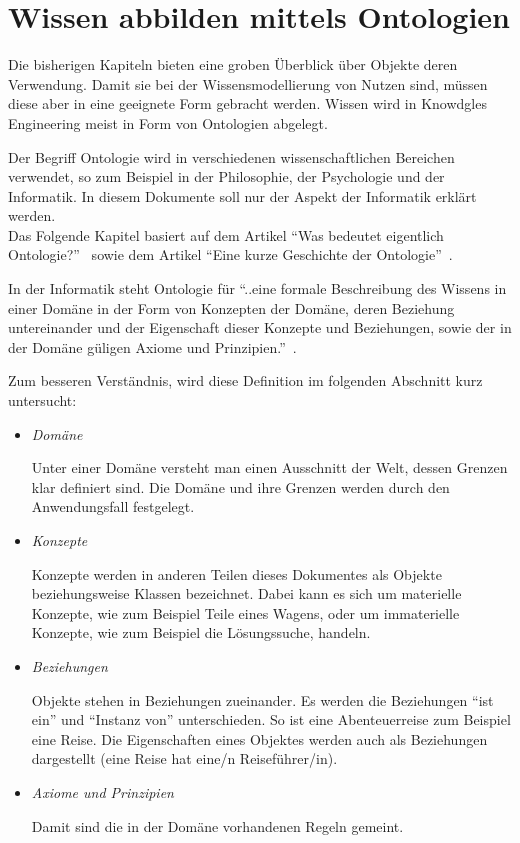 \chapter{Wissen abbilden mittels Ontologien}
\label{chap:ontologien}

Die bisherigen Kapiteln bieten eine groben Überblick über Objekte deren Verwendung. Damit sie bei der Wissensmodellierung von Nutzen sind, müssen diese aber in eine geeignete Form gebracht werden. Wissen wird in Knowdgles Engineering meist in Form von Ontologien abgelegt.

Der Begriff Ontologie wird in verschiedenen wissenschaftlichen Bereichen verwendet, so zum Beispiel in der Philosophie, der Psychologie und der Informatik. In diesem Dokumente soll nur der Aspekt der Informatik erklärt werden. \\
Das Folgende Kapitel basiert auf dem Artikel ``Was bedeutet eigentlich Ontologie?''~\cite{IspekOntoBedeutung} sowie dem Artikel ``Eine kurze Geschichte der Ontologie''~\cite{ISpekOntoGeschichte}.

In der Informatik steht Ontologie für ``..eine formale Beschreibung des Wissens in einer Domäne in der Form von Konzepten der Domäne, deren Beziehung untereinander und der Eigenschaft dieser Konzepte und Beziehungen, sowie der in der Domäne güligen Axiome und Prinzipien.''~\cite[S.310]{ISpekOntoGeschichte}.

Zum besseren Verständnis, wird diese Definition im folgenden Abschnitt kurz untersucht:
\begin{itemize}
    \item \textit{Domäne}

        Unter einer Domäne versteht man einen Ausschnitt der Welt, dessen Grenzen klar definiert sind. Die Domäne und ihre Grenzen werden durch den Anwendungsfall festgelegt.

    \item \textit{Konzepte}

        Konzepte werden in anderen Teilen dieses Dokumentes als Objekte beziehungsweise Klassen bezeichnet. Dabei kann es sich um materielle Konzepte, wie zum Beispiel Teile eines Wagens, oder um immaterielle Konzepte, wie zum Beispiel die Lösungssuche, handeln.

    \item \textit{Beziehungen}

        Objekte stehen in Beziehungen zueinander. Es werden die Beziehungen ``ist ein'' und ``Instanz von'' unterschieden. So ist eine Abenteuerreise zum Beispiel eine Reise. Die Eigenschaften eines Objektes werden auch als Beziehungen dargestellt (eine Reise hat eine/n Reiseführer/in).

    \item \textit{Axiome und Prinzipien}

        Damit sind die in der Domäne vorhandenen Regeln gemeint.
\end{itemize}

